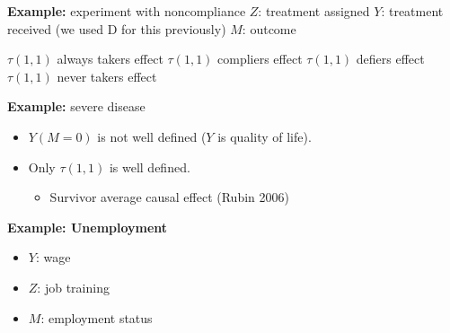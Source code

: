 \textbf{Example:} experiment with noncompliance \newline
    \( Z \): treatment assigned \newline
    \( Y \): treatment received (we used D for this previously) \newline
    \( M \): outcome

\begin{center}
\end{center}

\(\tau(1,1)\) always takers effect \newline
\(\tau(1,1)\) compliers effect \newline
\(\tau(1,1)\) defiers effect \newline
\(\tau(1,1)\) never takers effect \newline

\textbf{Example:} severe disease
    \begin{itemize}
        \item \(Y(M=0)\) is not well defined (\(Y\) is quality of life).
        \item Only \(\tau(1,1)\) is well defined.
        \begin{itemize}
            \item Survivor average causal effect (Rubin 2006) 
        \end{itemize}

    \end{itemize}

\textbf{Example: Unemployment}
\begin{itemize}
    \item \( Y \): wage
    \item \( Z \): job training
    \item \( M \): employment status
\end{itemize}

